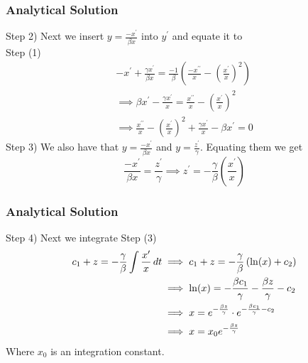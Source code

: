 \documentclass{beamer}
\begin{document}
\begin{frame}\frametitle{Analytical Solution}
Step 2) Next we insert $y = \frac{-x^{\prime}}{\beta x}$ into $y^{\prime}$ and equate it to \\Step (1)
\begin{equation*} 
	\begin{split}
		-x^{\prime} + \frac{\gamma x^{\prime}}{\beta x} =
		\frac{-1}{\beta}\left(\frac{-x^{\prime\prime}}{x} - \left(\frac{x^{\prime}}{x}\right)^{2}\right)\\
		\implies \beta x^{\prime} - \frac{\gamma x^{\prime}}{x} = \frac{x^{\prime\prime}}{x} - \left(\frac{x^{\prime}}{x}\right)^{2}    \\
		\implies \frac{x^{\prime\prime}}{x} - \left(\frac{x^{\prime}}{x}\right)^{2} + \frac{\gamma x^{\prime}}{x} - \beta x^{\prime}= 0
	\end{split}
\end{equation*}
Step 3) We also have that $y = \frac{-x^{\prime}}{\beta x}$ and $y = \frac{z^{\prime}}{\gamma}$.
Equating them we get
\begin{equation*}
	\frac{-x^{\prime}}{\beta x} = \frac{z^{\prime}}{\gamma}
	\implies z^{\prime} = -\frac{\gamma}{\beta}\left(\frac{x^{\prime}}{x}\right)
\end{equation*}
\end{frame}

\begin{frame}\frametitle{Analytical Solution}
Step 4) Next we integrate Step (3)
\begin{equation*} 
	\begin{split}
		c_{1} + z = -\frac{\gamma}{\beta} \int \frac{x^{\prime}}{x} \,dt
		 & \implies c_{1} + z = -\frac{\gamma}{\beta}\left(\ln(x) + c_{2}\right)                                       \\
		 & \implies \ln(x) = -\frac{\beta c_{1}}{\gamma} -\frac{\beta z}{\gamma} - c_{2}                               \\
		 & \implies x = e^{-\frac{\beta z}{\gamma}} \cdot e^{-\frac{\beta c_{1}}{\gamma} - c_{2}}                      \\
		 & \implies x = x_{0}e^{-\frac{\beta z}{\gamma}}  \hspace{\parindent}  
	\end{split}
\end{equation*}
Where $x_{0}$ is an integration constant.
\end{frame}
\end{document}
